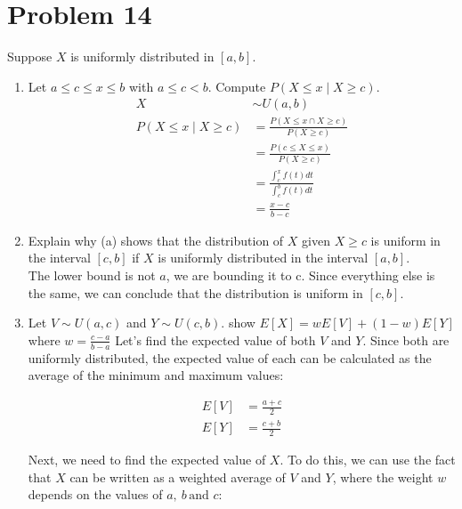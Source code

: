 \documentclass{article}
\begin{document}
\section*{Problem 14}
Suppose \(X\) is uniformly distributed in \([a, b]\).
\begin{enumerate}[label=\alph*)]
    \item Let \(a \leq c \leq x \leq b\) with \(a \leq c < b\). Compute \(P(X \leq x \mid X \geq c)\).
          \begin{align*}
              X                         & \sim U(a, b)                                    \\
              P(X \leq x \mid X \geq c) & = \frac{P(X \leq x \cap X \geq c)}{P(X \geq c)} \\
                                        & = \frac{P(c\leq X \leq x)}{P(X \geq c)}         \\
                                        & = \frac{\int_{c}^{x}f(t)dt}{\int_{c}^{b}f(t)dt} \\
                                        & = \frac{x - c}{b - c}
          \end{align*}
    \item Explain why (a) shows that the distribution of \(X\) given \(X \geq c\) is uniform in the interval \([c, b]\) if \(X\) is uniformly distributed in the interval \([a, b]\).\\
          The lower bound is not \(a\), we are bounding it to c. Since everything else is the same, we can conclude that the distribution is uniform in \([c, b]\).
    \item Let \(V \sim U(a, c)\) and \(Y \sim U(c, b)\). show \(E[X] = wE[V] + (1-w)E[Y]\) where \(w = \frac{c-a}{b-a}\)
          Let's find the expected value of both \(V\) and \(Y\). Since both are uniformly distributed, the expected value of each can be calculated as the average of the minimum and maximum values:

\begin{align*}
E[V] &= \frac{a + c}{2} \\
E[Y] &= \frac{c + b}{2}
\end{align*}

Next, we need to find the expected value of \(X\). To do this, we can use the fact that \(X\) can be written as a weighted average of \(V\) and \(Y\), where the weight \(w\) depends on the values of \(a,\ b\, \text{and } c\):


\end{enumerate}
\end{document}
